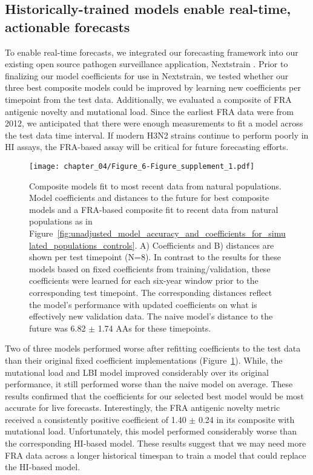 \subsection*{Historically-trained models enable real-time, actionable forecasts}

To enable real-time forecasts, we integrated our forecasting framework into our existing open source pathogen surveillance application, Nextstrain \citep{Hadfield2018}.
Prior to finalizing our model coefficients for use in Nextstrain, we tested whether our three best composite models could be improved by learning new coefficients per timepoint from the test data.
Additionally, we evaluated a composite of FRA antigenic novelty and mutational load.
Since the earliest FRA data were from 2012, we anticipated that there were enough measurements to fit a model across the test data time interval.
If modern H3N2 strains continue to perform poorly in HI assays, the FRA-based assay will be critical for future forecasting efforts.

\begin{figure}
  \texttt{[image: chapter\_04/Figure\_6-Figure\_supplement\_1.pdf]}
  \caption{
    Composite models fit to most recent data from natural populations.
    Model coefficients and distances to the future for best composite models and a FRA-based composite fit to recent data from natural populations as in Figure~\ref{fig:unadjusted_model_accuracy_and_coefficients_for_simulated_populations_controls}.
    A) Coefficients and B) distances are shown per test timepoint (N=8).
    In contrast to the results for these models based on fixed coefficients from training/validation, these coefficients were learned for each six-year window prior to the corresponding test timepoint.
    The corresponding distances reflect the model's performance with updated coefficients on what is effectively new validation data.
    The naive model's distance to the future was 6.82 $\pm$ 1.74 AAs for these timepoints.
  }
  \label{fig:updated_model_accuracy_and_coefficients_for_natural_populations_across_test_data}
\end{figure}

Two of three models performed worse after refitting coefficients to the test data than their original fixed coefficient implementations (Figure~\ref{fig:updated_model_accuracy_and_coefficients_for_natural_populations_across_test_data}).
While, the mutational load and LBI model improved considerably over its original performance, it still performed worse than the naive model on average.
These results confirmed that the coefficients for our selected best model would be most accurate for live forecasts.
Interestingly, the FRA antigenic novelty metric received a consistently positive coefficient of 1.40 $\pm$ 0.24 in its composite with mutational load.
Unfortunately, this model performed considerably worse than the corresponding HI-based model.
These results suggest that we may need more FRA data across a longer historical timespan to train a model that could replace the HI-based model.

